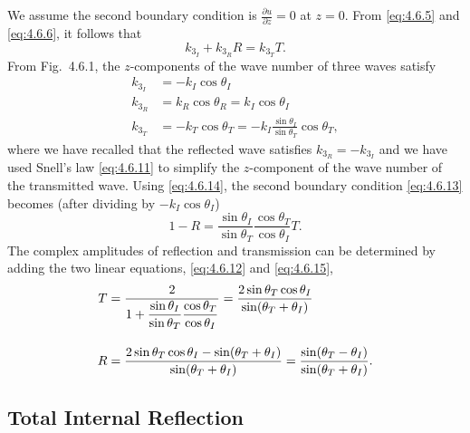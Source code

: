 We assume the second boundary condition is $\frac{\partial u}{\partial z} = 0$ at $z = 0$.  From \eqref{eq:4.6.5} and \eqref{eq:4.6.6}, it follows that
\begin{equation}
k_{3_I} + k_{3_R}R = k_{3_T}T.
\label{eq:4.6.13}
\end{equation}
From Fig.~4.6.1, the $z$-components of the wave number of three waves satisfy
\begin{equation}
\begin{aligned}
k_{3_I} &= -k_I\cos\theta_I \\
k_{3_R} &= k_R\cos\theta_R = k_I\cos\theta_I \\
k_{3_T} &= -k_T\cos\theta_T = -k_I\frac{\sin\theta_I}{\sin\theta_T}\cos\theta_T,
\end{aligned}
\label{eq:4.6.14}
\end{equation}
where we have recalled that the reflected wave satisfies $k_{3_R} = -k_{3_I}$ and we have used Snell's law \eqref{eq:4.6.11} to simplify the $z$-component of the wave number of the transmitted wave.  Using \eqref{eq:4.6.14}, the second boundary condition \eqref{eq:4.6.13} becomes (after dividing by $-k_I\cos\theta_I$)
\begin{equation}
1 - R = \frac{\sin\theta_I}{\sin\theta_T}\frac{\cos\theta_T}{\cos\theta_I}T.
\label{eq:4.6.15}
\end{equation}
The complex amplitudes of reflection and transmission can be determined by adding the two linear equations, \eqref{eq:4.6.12} and \eqref{eq:4.6.15},
\begin{align}
T &= \frac{2}{1 + \dfrac{\sin\theta_I}{\sin\theta_T}\dfrac{\cos\theta_T}{\cos\theta_I}} = \frac{2\sin\theta_T\cos\theta_I}{\sin(\theta_T + \theta_I)} \notag\\[10pt]
R &= \frac{2\sin\theta_T\cos\theta_I - \sin(\theta_T+\theta_I)}{\sin(\theta_T+\theta_I)} = \frac{\sin(\theta_T - \theta_I)}{\sin(\theta_T + \theta_I)}. \notag
\end{align}

\subsection{Total Internal Reflection}
\label{sec:total-internal-reflection}

